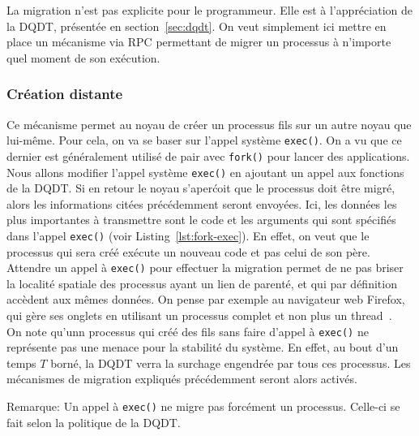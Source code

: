         La migration n'est pas explicite pour le programmeur. Elle est à
        l'appréciation de la DQDT, présentée en section~\ref{sec:dqdt}. On veut
        simplement ici mettre en place un mécanisme via RPC permettant de migrer
        un processus à n'importe quel moment de son exécution.

      \subsubsection{Création distante}

        Ce mécanisme permet au noyau de créer un processus fils sur un autre
        noyau que lui-même. Pour cela, on va se baser sur l'appel système
        \texttt{exec()}. On a vu que ce dernier est généralement utilisé de pair
        avec \texttt{fork()} pour lancer des applications. Nous allons modifier
        l'appel système \texttt{exec()} en ajoutant un appel aux fonctions de la
        DQDT. Si en retour le noyau s'aperćoit que le processus doit être migré,
        alors les informations citées précédemment seront envoyées. Ici, les
        données les plus importantes à transmettre sont le code et les arguments
        qui sont spécifiés dans l'appel \texttt{exec()} (voir
        Listing~\ref{lst:fork-exec}). En effet, on veut que le processus qui
        sera créé exécute un nouveau code et pas celui de son père.\\

        Attendre un appel à \texttt{exec()} pour effectuer la migration permet
        de ne pas briser la localité spatiale des processus ayant un lien de
        parenté, et qui par définition accèdent aux mêmes données. On pense par
        exemple au navigateur web Firefox, qui gère ses onglets en utilisant un
        processus complet et non plus un thread~\citep{mozillaElectrolysis}.\\

        On note qu'unn processus qui créé des fils sans faire d'appel à
        \texttt{exec()} ne représente pas une menace pour la stabilité du
        système. En effet, au bout d'un temps $T$ borné, la DQDT verra la
        surchage engendrée par tous ces processus. Les mécanismes de migration
        expliqués précédemment seront alors activés.

        \begin{paragraph}{Remarque:}
          Un appel à \texttt{exec()} ne migre pas forcément un
          processus. Celle-ci se fait selon la politique de la DQDT.
        \end{paragraph}


